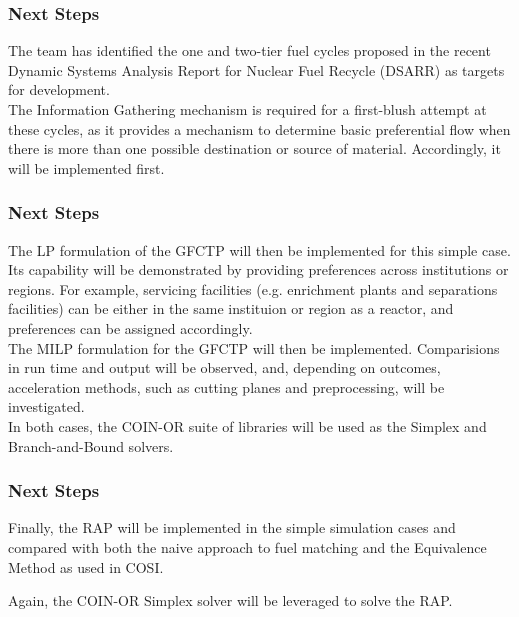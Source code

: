 \begin{frame}[ctb!]
  \frametitle{Next Steps} 
  
  The \Cyclus team has identified the one and two-tier fuel cycles proposed in
  the recent Dynamic Systems Analysis Report for Nuclear Fuel Recycle (DSARR)
  \cite{dixon_dynamic_2008} as targets for development.\\

  The Information Gathering mechanism is required for a first-blush attempt at
  these cycles, as it provides a mechanism to determine basic preferential flow
  when there is more than one possible destination or source of
  material. Accordingly, it will be implemented first.\\
\end{frame}

\begin{frame}[ctb!]
  \frametitle{Next Steps} 

  The LP formulation of the GFCTP will then be implemented for this simple
  case. Its capability will be demonstrated by providing preferences across
  institutions or regions. For example, servicing facilities (e.g. enrichment
  plants and separations facilities) can be either in the same instituion or
  region as a reactor, and preferences can be assigned accordingly.\\

  The MILP formulation for the GFCTP will then be implemented. Comparisions in
  run time and output will be observed, and, depending on outcomes, acceleration
  methods, such as cutting planes and preprocessing, will be investigated.\\

  In both cases, the COIN-OR\cite{lougee_common_2003} suite of libraries will be
  used as the Simplex and Branch-and-Bound solvers.

\end{frame}

\begin{frame}[ctb!]
  \frametitle{Next Steps} 
  
  Finally, the RAP will be implemented in the simple simulation cases and
  compared with both the naive approach to fuel matching and the Equivalence
  Method as used in COSI. 

  Again, the COIN-OR Simplex solver will be leveraged to solve the RAP.

\end{frame}
